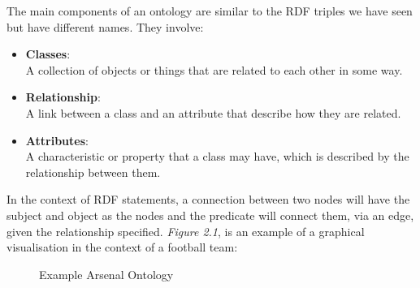 The main components of an ontology are similar to the RDF triples we have seen but have different names. They involve:

\vspace{-0.15cm}
\begin{itemize}
    \itemsep0em 
\item \textbf{Classes}: \\
A collection of objects or things that are related to each other in some way.

\item \textbf{Relationship}: \\
A link between a class and an attribute that describe how they are related. 

\item \textbf{Attributes}:\\ 
A characteristic or property that a class may have, which is described by the relationship between them.

\end{itemize}
\vspace{-0.15cm}

In the context of RDF statements, a connection between two nodes will have the subject and object as the nodes and the predicate will connect them, via an edge, given the relationship specified. \textit{Figure 2.1}, is an example of a graphical visualisation in the context of a football team:

\begin{figure}
\begin{center}
\end{center}
\vspace{-0.2cm}
\caption{Example Arsenal Ontology}
\end{figure}
\vspace{-0.15cm}

